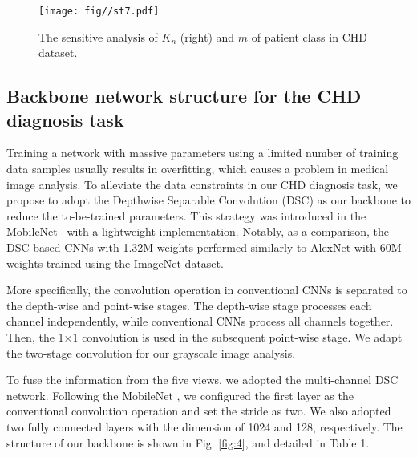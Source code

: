  \begin{figure}[t]
\centering
\texttt{[image: fig//st7.pdf]}\\ 
\caption{The sensitive analysis of $K_n$ (right) and $m$ of patient class in CHD dataset.}\label{fig:77} 
\end{figure}




\subsection{Backbone network structure for the CHD diagnosis task}

Training a network with massive parameters using a limited number of training data samples usually results in overfitting, which causes a problem in medical image analysis. To alleviate the data constraints in our CHD diagnosis task, we propose to adopt the Depthwise Separable Convolution (DSC) \cite{howard2017mobilenets} as our backbone to reduce the to-be-trained parameters. This strategy was introduced in the MobileNet~\cite{howard2017mobilenets} with a lightweight implementation. Notably, as a comparison, the DSC based CNNs with 1.32M weights performed similarly to AlexNet \cite{simonyan2014very} with 60M weights trained using the ImageNet dataset. 

More specifically, the convolution operation in conventional CNNs is separated to the depth-wise and point-wise stages. The depth-wise stage processes each channel independently, while conventional CNNs process all channels together. Then, the 1$\times1$ convolution is used in the subsequent point-wise stage. We adapt the two-stage convolution for our grayscale image analysis.

To fuse the information from the five views, we adopted the multi-channel DSC network. Following the MobileNet \cite{howard2017mobilenets}, we configured the first layer as the conventional convolution operation and set the stride as two. We also adopted two fully connected layers with the dimension of 1024 and 128, respectively. The structure of our backbone is shown in Fig. \ref{fig:4}, and detailed in Table 1.




